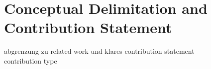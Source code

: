 \chapter{Conceptual Delimitation and Contribution Statement}
abgrenzung zu related work und klares contribution statement\\
contribution type